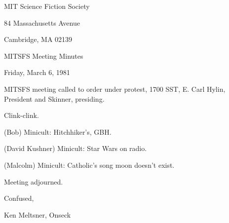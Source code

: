 \documentclass[12pt]{article}
\begin{document}
\begin{center}

MIT Science Fiction Society 

84 Massachusetts Avenue

Cambridge, MA 02139

\vspace{12pt}

MITSFS Meeting Minutes 

Friday, March 6, 1981

\end{center}
 
\vspace{18pt}

\setlength{\parskip}{6pt}

\noindent
MITSFS meeting called to order under protest, 1700 SST,
E. Carl Hylin, President and Skinner, presiding.

Clink-clink.

(Bob) Minicult: Hitchhiker's, GBH.

(David Kushner) Minicult: Star Wars on radio.

(Malcolm) Minicult: Catholic's song moon doesn't exist.

\vspace{12pt}

\noindent
Meeting adjourned.

\vspace{18pt}

\centerline{Confused,}
\centerline{Ken Meltsner, Onseck}
\end{document}

